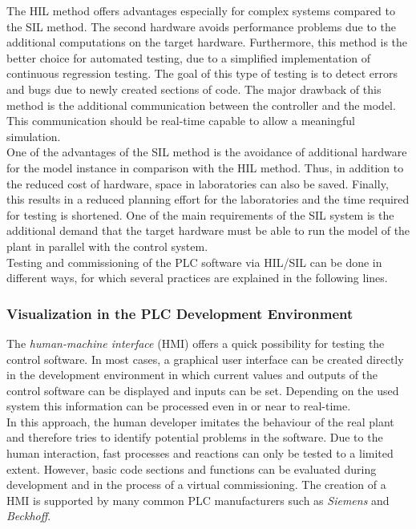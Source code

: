 	The \ac{HIL} method offers advantages especially for complex systems compared to the \ac{SIL} method. The second hardware avoids performance problems due to the additional computations on the target hardware. Furthermore, this method is the better choice for automated testing, due to a simplified implementation of continuous regression testing. The goal of this type of testing is to detect errors and bugs due to newly created sections of code. The major drawback of this method is the additional communication between the controller and the model. This communication should be real-time capable to allow a meaningful simulation.\\
    One of the advantages of the \ac{SIL} method is the avoidance of additional hardware for the model instance in comparison with the \ac{HIL} method. Thus, in addition to the reduced cost of hardware, space in laboratories can also be saved. Finally, this results in a reduced planning effort for the laboratories and the time required for testing is shortened. One of the main requirements of the SIL system is the additional demand that the target hardware must be able to run the model of the plant in parallel with the control system.  \\
      
	
    Testing and commissioning of the PLC software via HIL/SIL can be done in different ways, for which several practices are explained in the following lines. 

\subsubsection{Visualization in the PLC Development Environment}			%
	The \textit{human-machine interface} (\acs{HMI}) offers a quick possibility for testing the control software. In most cases, a graphical user interface can be created directly in the development environment in which current values and outputs of the control software can be displayed and inputs can be set. Depending on the used system this information can be processed even in or near to real-time. \\
	In this approach, the human developer imitates the behaviour of the real plant and therefore tries to identify potential problems in the software. Due to the human interaction, fast processes and reactions can only be tested to a limited extent. However, basic code sections and functions can be evaluated during development and in the process of a virtual commissioning. The creation of a \ac{HMI} is supported by many common PLC manufacturers such as \textit{Siemens} and \textit{Beckhoff}.
	
